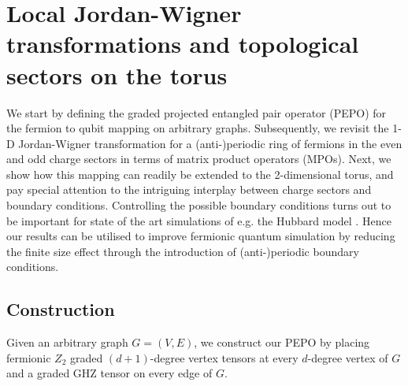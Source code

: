 \ifpdf
    \graphicspath{{Chapter2/Figs/Raster/}{Chapter2/Figs/PDF/}{Chapter2/Figs/}{Chapter2/}{Chapter2/PEPO/}}
\else
    \graphicspath{{Chapter2/Figs/Vector/}{Chapter2/Figs/}{Chapter2/}{Chapter2/PEPO/}}
\fi

\chapter{Local Jordan-Wigner transformations and topological sectors on the torus} 
\label{section:local_jw_torus}
  


 We start by defining the graded projected entangled  pair operator (PEPO) for the fermion to qubit mapping on arbitrary graphs. Subsequently, we revisit the 1-D Jordan-Wigner transformation for a (anti-)periodic ring of fermions in the even and odd charge sectors in terms of matrix product operators (MPOs). Next, we show how this mapping can readily be extended to the 2-dimensional torus, and pay special attention to the intriguing interplay between charge sectors and boundary conditions. Controlling the possible boundary conditions turns out to be important for state of the art simulations of e.g. the Hubbard model \cite{xu2023coexistence}. Hence our results can be utilised to improve fermionic quantum simulation by reducing the finite size effect through the introduction of (anti-)periodic boundary conditions. 

\section{Construction}
Given an arbitrary graph $G = (V,E)$, we construct our PEPO by placing  fermionic $Z_2$ graded  $(d+1)$-degree vertex tensors  \cite{Bultinck_2017} at every $d$-degree vertex of $G$ and a graded GHZ tensor on every edge of $G$.

